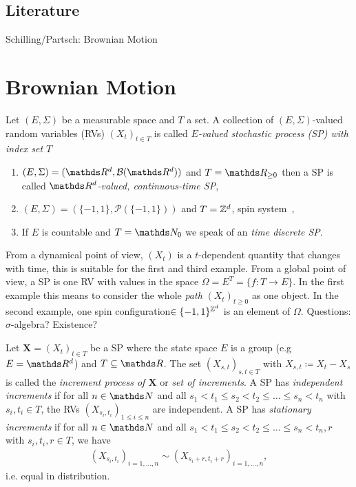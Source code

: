 \documentclass[10pt,a4paper]{report}
\begin{document}
\section*{Literature}
Schilling/Partsch: \glqq Brownian Motion\grqq

\chapter{Brownian Motion}
\begin{defi}
Let $(E,\Sigma)$ be a measurable space and $T$ a set.
A collection of $(E,\Sigma)$-valued random variables (RVs) $(X_t)_{t\in T}$ is called \emph{$E$-valued stochastic process (SP) with index set $T$}
\end{defi}

\begin{bsp}
\begin{enumerate}[label=(\alph*)]
\item $(E,\Sigma)=(\Rd,\mathcal{B}(\Rd))$ and $T=\R_{\geq 0}$ then a SP is called \emph{$\Rd$-valued, continuous-time SP},
\item $(E,\Sigma)=(\{-1,1\},\mathcal{P}(\{-1,1\}))$ and $T=\mathbb{Z}^d$, \glqq spin system\grqq\, ,
\item If $E$ is countable and $T=\N_0$ we speak of an \emph{time discrete SP}.
\end{enumerate}
\end{bsp}

\begin{bem}
From a dynamical point of view, $(X_t)$ is a $t$-dependent quantity that changes with time, this is suitable for the first and third example.
From a global point of view, a SP is one RV with values in the space $\Omega=E^T=\{f\colon T\to E\}$.
In the first example this means to consider the whole \emph{path} $(X_t)_{t\geq 0}$ as one object.
In the second example, one \glqq spin configuration\grqq $\in \{-1,1\}^{\mathbb{Z}^d}$ is an element of $\Omega$.
Questions: $\sigma$-algebra? Existence?
\end{bem}

\begin{defi}
Let $\textbf{X}=(X_t)_{t\in T}$ be a SP where the state space $E$ is a group (e.g $E=\Rd$) and $T\subseteq \R$.
The set $(X_{s,t})_{s,t\in T}$ with $X_{s,t}\coloneqq X_t-X_s$ is called the \emph{increment process of $\textbf{X}$} or \emph{set of increments}.
A SP has \emph{independent increments} if for all $n\in \N$ and all $s_1<t_1\leq s_2 <t_2\leq \dots \leq s_n<t_n$ with $s_i,t_i \in T$, the RVs $(X_{s_i,t_i})_{1\leq i \leq n}$ are independent.
A SP has \emph{stationary increments} if for all $n\in \N$ and all $s_1<t_1\leq s_2 <t_2\leq \dots \leq s_n<t_n, r$ with $s_i,t_i,r \in T$, we have
\begin{align*}
(X_{s_i,t_i})_{i=1,\dots,n}\sim  (X_{s_i+r,t_i+r})_{i=1,\dots,n},
\end{align*}
i.e. equal in distribution. 
\end{defi}
\end{document}
